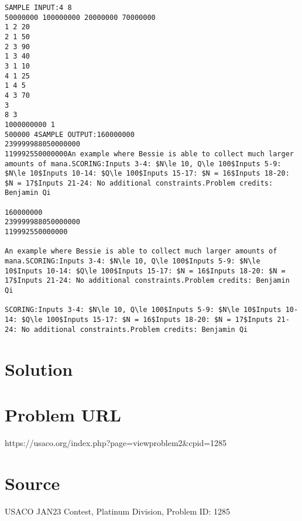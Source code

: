 \documentclass[12pt]{article}
\begin{document}
\begin{verbatim}
SAMPLE INPUT:4 8
50000000 100000000 20000000 70000000
1 2 20
2 1 50
2 3 90
1 3 40
3 1 10
4 1 25
1 4 5
4 3 70
3
8 3
1000000000 1
500000 4SAMPLE OUTPUT:160000000
239999988050000000
119992550000000An example where Bessie is able to collect much larger amounts of mana.SCORING:Inputs 3-4: $N\le 10, Q\le 100$Inputs 5-9: $N\le 10$Inputs 10-14: $Q\le 100$Inputs 15-17: $N = 16$Inputs 18-20: $N = 17$Inputs 21-24: No additional constraints.Problem credits: Benjamin Qi

160000000
239999988050000000
119992550000000

An example where Bessie is able to collect much larger amounts of mana.SCORING:Inputs 3-4: $N\le 10, Q\le 100$Inputs 5-9: $N\le 10$Inputs 10-14: $Q\le 100$Inputs 15-17: $N = 16$Inputs 18-20: $N = 17$Inputs 21-24: No additional constraints.Problem credits: Benjamin Qi

SCORING:Inputs 3-4: $N\le 10, Q\le 100$Inputs 5-9: $N\le 10$Inputs 10-14: $Q\le 100$Inputs 15-17: $N = 16$Inputs 18-20: $N = 17$Inputs 21-24: No additional constraints.Problem credits: Benjamin Qi
\end{verbatim}

\section*{Solution}


\section*{Problem URL}
https://usaco.org/index.php?page=viewproblem2&cpid=1285

\section*{Source}
USACO JAN23 Contest, Platinum Division, Problem ID: 1285
\end{document}

